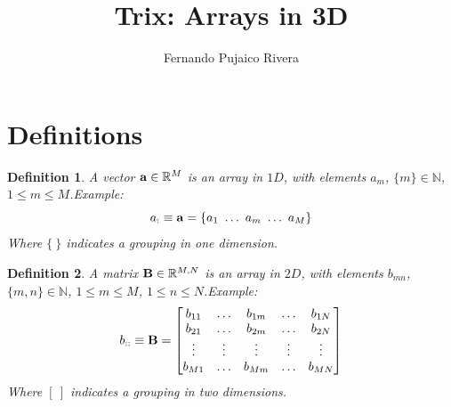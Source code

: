\documentclass[11pt]{article}
\title{\textbf{Trix: Arrays in 3D}}
\author{Fernando Pujaico Rivera}
\date{}
\newcommand{\MATRIX}[1]{\mathbf{\uppercase{#1}}}
\newcommand{\VECTOR}[1]{\mathbf{\lowercase{#1}}}
\newcommand{\dimsep}{,}
\newtheorem{definition}{Definition}
\begin{document}
\maketitle

\section{Definitions}
\begin{definition}\label{def:vector}
A vector $\VECTOR{a}\in \mathbb{R}^{M}$ is an array in $1D$, with elements $a_{m}$, 
$\{m\}\in \mathbb{N}$, $1 \leq m \leq M$.Example:
\begin{equation}
 a_{:}\equiv \VECTOR{a}=\{a_1~\hdots~a_m~\hdots~a_{M} \}
\end{equation}
Where $\{~\}$ indicates a grouping in one dimension. 
\end{definition}

\begin{definition}\label{def:matrix}
A matrix $\MATRIX{B}\in \mathbb{R}^{M\dimsep N }$ is an array in $2D$, with elements $b_{mn}$, 
$\{m,n\}\in\mathbb{N}$, $1 \leq m \leq M$, $1 \leq n \leq N$.Example:
\begin{equation}
 b_{::}\equiv \MATRIX{B}=\left[
 \begin{matrix}
 b_{11} &\hdots &b_{1m} &\hdots &b_{1N}\\ 
 b_{21} &\hdots &b_{2m} &\hdots &b_{2N}\\
 \vdots &\vdots &\vdots &\vdots &\vdots\\ 
 b_{M1} &\hdots &b_{Mm} &\hdots &b_{MN}\\ 
 \end{matrix}
 \right]
\end{equation}
Where $[~]$ indicates a grouping in two dimensions. 
\end{definition}
\end{document}
